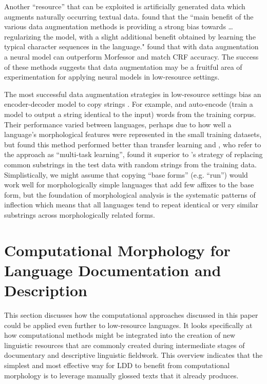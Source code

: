 \documentclass[12pt]{article}
\begin{document}
Another ``resource'' that can be exploited is artificially generated data which augments naturally occurring textual data.  found that the ``main benefit of the various data augmentation methods is providing a strong bias towards … regularizing the model, with a slight additional benefit obtained by learning the typical character sequences in the language."  found that with data augmentation a neural model can outperform Morfessor and match CRF accuracy. The success of these methods suggests that data augmentation may be a fruitful area of experimentation for applying neural models in low-resource settings.

The most successful data augmentation strategies in low-resource settings bias an encoder-decoder model to copy strings \cite{bergmanis_training_2017,kann_fortification_2018,makarov_align_2017,makarov_uzh_2018}. For example,  and  auto-encode (train a model to output a string identical to the input) words from the training corpus. Their performance varied between languages, perhaps due to how well a language’s morphological features were represented in the small training datasets, but  found this method performed better than transfer learning and , who refer to the approach as ``multi-task learning'', found it superior to 's strategy of replacing common substrings in the test data with random strings from the training data.  Simplistically, we might assume that copying ``base forms'' (e.g. ``run'') would work well for morphologically simple languages that add few affixes to the base form, but the foundation of morphological analysis is the systematic patterns of inflection which means that all languages tend to repeat identical or very similar substrings across morphologically related forms. 

\section{Computational Morphology for Language Documentation and Description}
\label{CLLDD}

This section discusses how the computational approaches discussed in this paper could be applied even further to low-resource languages. It looks specifically at how computational methods might be integrated into the creation of new linguistic resources that are commonly created during intermediate stages of documentary and descriptive linguistic fieldwork. This overview indicates that the simplest and most effective way for LDD to benefit from computational morphology is to leverage manually glossed texts that it already produces.
\end{document}
